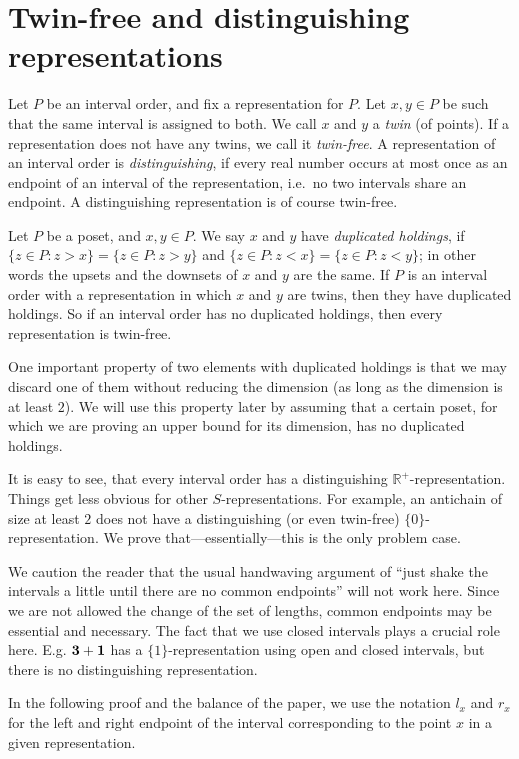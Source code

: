 \section{Twin-free and distinguishing representations}

Let $P$ be an interval order, and fix a representation for $P$. Let $x,y\in P$ be such that the same interval is assigned to both. We call $x$ and $y$ a \emph{twin} (of points). If a representation does not have any twins, we call it \emph{twin-free}. A representation of an interval order is \emph{distinguishing}, if every real number occurs at most once as an endpoint of an interval of the representation, i.e.~no two intervals share an endpoint. A distinguishing representation is of course twin-free.

Let $P$ be a poset, and $x,y\in P$. We say $x$ and $y$ have \emph{duplicated holdings}, if $\{z\in P: z>x\}=\{z\in P: z>y\}$ and $\{z\in P: z<x\}=\{z\in P: z<y\}$; in other words the upsets and the downsets of $x$ and $y$ are the same. If $P$ is an interval order with a representation in which $x$ and $y$ are twins, then they have duplicated holdings. So if an interval order has no duplicated holdings, then every representation is twin-free.

One important property of two elements with duplicated holdings is that we may discard one of them without reducing the dimension (as long as the dimension is at least $2$). We will use this property later by assuming that a certain poset, for which we are proving an upper bound for its dimension, has no duplicated holdings.

It is easy to see, that every interval order has a distinguishing $\mathbb{R}^+$-representation. Things get less obvious for other $S$-representations. For example, an antichain of size at least $2$ does not have a distinguishing (or even twin-free) $\{0\}$-representation. We prove that---essentially---this is the only problem case.

We caution the reader that the usual handwaving argument of ``just shake the intervals a little until there are no common endpoints'' will not work here. Since we are not allowed the change of the set of lengths, common endpoints may be essential and necessary. The fact that we use closed intervals plays a crucial role here. E.g. $\mathbf{3}+\mathbf{1}$ has a $\{1\}$-representation using open and closed intervals, but there is no distinguishing representation.

In the following proof and the balance of the paper, we use the notation $l_x$ and $r_x$ for the left and right endpoint of the interval corresponding to the point $x$ in a given representation.

